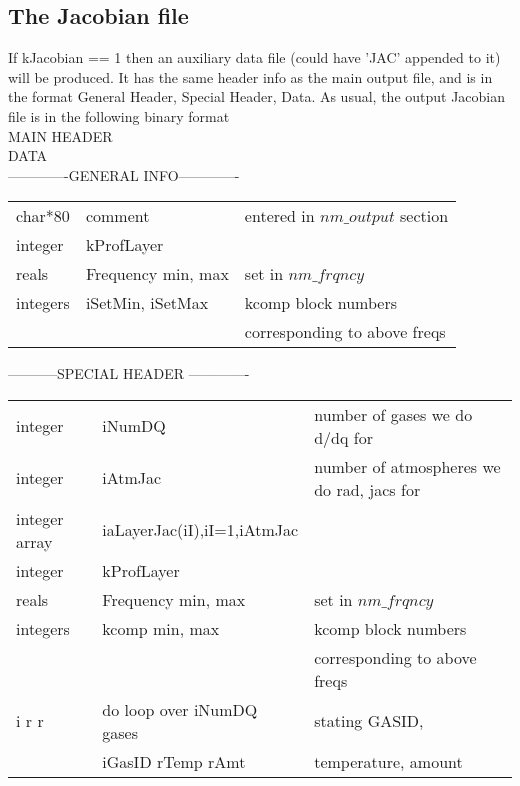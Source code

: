 \documentclass[12pt]{article}
\newlength{\colwidth}
\begin{document}
{{{{\subsection{ The Jacobian file}

If kJacobian == 1 then an auxiliary data file (could have 'JAC' appended to it)
will be produced.  It has the same header info as the main output file, and
is in the format General Header, Special Header, Data.  As usual, the
output Jacobian  file is in the following binary format\\
MAIN HEADER\\
DATA\\

-------------GENERAL INFO-------------\\
\begin{longtable}{llp{\colwidth}}
{\sf char*80}    & comment & entered in $nm\_output$ section\\
{\sf integer}    & kProfLayer &\\
{\sf reals}      & Frequency min, max &set in $nm\_frqncy$\\
{\sf integers}   & iSetMin, iSetMax  & kcomp block numbers \\
                 &                   & corresponding to above freqs \\
\end{longtable}

-----------SPECIAL HEADER -------------\\
\begin{longtable}{llp{\colwidth}}
{\sf integer}       & iNumDQ & number of gases we do d/dq for\\
{\sf integer}       & iAtmJac & number of atmospheres we do rad, jacs for\\
{\sf integer array} & iaLayerJac(iI),iI=1,iAtmJac & \\


{\sf integer}    & kProfLayer &\\
{\sf reals}      & Frequency min, max &set in $nm\_frqncy$\\
{\sf integers}   & kcomp min, max  & kcomp block numbers \\
                 &                 & corresponding to above freqs \\
{\sf i r r}      &do loop over iNumDQ gases & stating GASID, \\
                 &\indent iGasID rTemp rAmt & temperature, amount \\

\end{longtable}

}}}}
\end{document}
